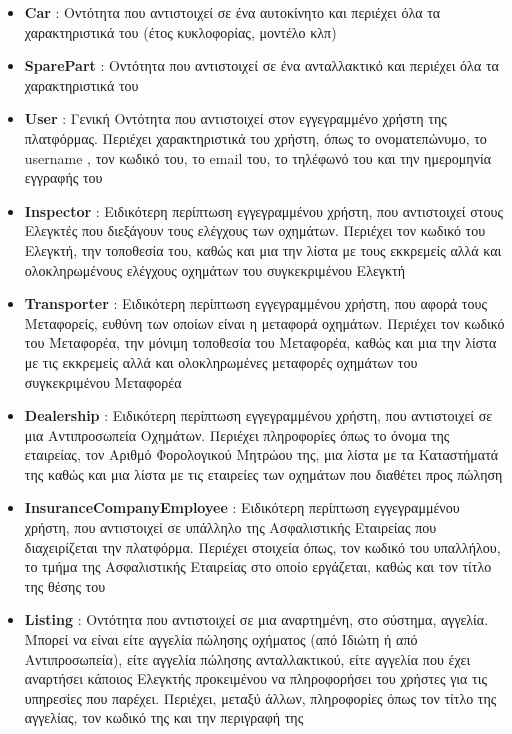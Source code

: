 \documentclass{../ol-softwaremanual}
\begin{document}
	
	
	\newpage
	
	
	\begin{itemize}
		\item \en \textbf{Car} \gr : Οντότητα που αντιστοιχεί σε ένα αυτοκίνητο και περιέχει όλα τα χαρακτηριστικά του (έτος κυκλοφορίας, μοντέλο κλπ)		
		\item \en \textbf{SparePart} \gr : Οντότητα που αντιστοιχεί σε ένα ανταλλακτικό και περιέχει όλα τα χαρακτηριστικά του
		\item \en \textbf{User} \gr : Γενική Οντότητα που αντιστοιχεί στον εγγεγραμμένο χρήστη της πλατφόρμας. Περιέχει χαρακτηριστικά του χρήστη, όπως το ονοματεπώνυμο, το \en username \gr, τον κωδικό του, το \en email \gr του, το τηλέφωνό του και την ημερομηνία εγγραφής του
		\item \en \textbf{Inspector} \gr : Ειδικότερη περίπτωση εγγεγραμμένου χρήστη, που αντιστοιχεί στους Ελεγκτές που διεξάγουν τους ελέγχους των οχημάτων. Περιέχει τον κωδικό του Ελεγκτή, την τοποθεσία του, καθώς και μια την λίστα με τους εκκρεμείς αλλά και ολοκληρωμένους ελέγχους οχημάτων του συγκεκριμένου Ελεγκτή
		\item \en \textbf{Transporter} \gr : Ειδικότερη περίπτωση εγγεγραμμένου χρήστη, που αφορά τους Μεταφορείς, ευθύνη των οποίων είναι η μεταφορά οχημάτων. Περιέχει τον κωδικό του Μεταφορέα, την μόνιμη τοποθεσία του Μεταφορέα, καθώς και μια την λίστα με τις εκκρεμείς αλλά και ολοκληρωμένες μεταφορές οχημάτων του συγκεκριμένου Μεταφορέα
		\item \en \textbf{Dealership} \gr : Ειδικότερη περίπτωση εγγεγραμμένου χρήστη, που αντιστοιχεί σε μια Αντιπροσωπεία Οχημάτων. Περιέχει πληροφορίες όπως το όνομα της εταιρείας, τον Αριθμό Φορολογικού Μητρώου της, μια λίστα με τα Καταστήματά της καθώς και μια λίστα με τις εταιρείες των οχημάτων που διαθέτει προς πώληση
		\item \en \textbf{InsuranceCompanyEmployee} \gr : Ειδικότερη περίπτωση εγγεγραμμένου χρήστη, που αντιστοιχεί σε υπάλληλο της Ασφαλιστικής Εταιρείας που διαχειρίζεται την πλατφόρμα. Περιέχει στοιχεία όπως, τον κωδικό του υπαλλήλου, το τμήμα της Ασφαλιστικής Εταιρείας στο οποίο εργάζεται, καθώς και τον τίτλο της θέσης του
		\item \en \textbf{Listing} \gr : Οντότητα που αντιστοιχεί σε μια αναρτημένη, στο σύστημα, αγγελία. Μπορεί να είναι είτε αγγελία πώλησης οχήματος (από Ιδιώτη ή από Αντιπροσωπεία), είτε αγγελία πώλησης ανταλλακτικού, είτε αγγελία που έχει αναρτήσει κάποιος Ελεγκτής προκειμένου να πληροφορήσει του χρήστες για τις υπηρεσίες που παρέχει. Περιέχει, μεταξύ άλλων, πληροφορίες όπως τον τίτλο της αγγελίας, τον κωδικό της και την περιγραφή της

\end{itemize}
\end{document}
